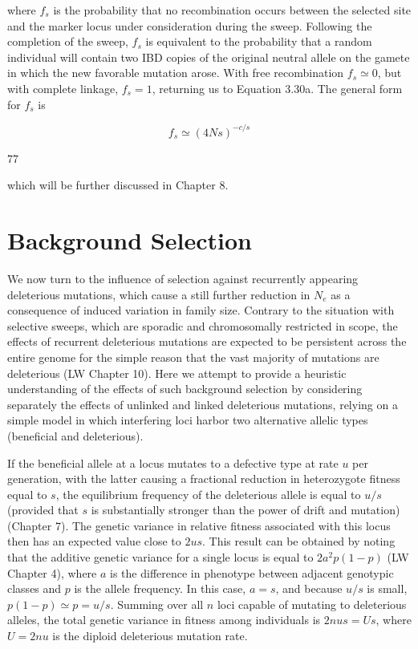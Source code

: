 \documentclass{article}
\begin{document}
where  $ f_s $ is the probability that no recombination occurs between the selected site and the marker locus under consideration during the sweep. Following the completion of the sweep,  $ f_s $ is equivalent to the probability that a random individual will contain two IBD copies of the original neutral allele on the gamete in which the new favorable mutation arose. With free recombination  $ f_s \simeq 0 $, but with complete linkage,  $ f_s = 1 $, returning us to Equation 3.30a. The general form for  $ f_s $ is

\begin{equation}
f_{s}\simeq(4N s)^{-c/s}
\tag{3.31}
\label{eq:3_31}
\end{equation}

77

which will be further discussed in Chapter 8.

\section{Background Selection}
We now turn to the influence of selection against recurrently appearing deleterious mutations, which cause a still further reduction in  $ N_{e} $ as a consequence of induced variation in family size. Contrary to the situation with selective sweeps, which are sporadic and chromosomally restricted in scope, the effects of recurrent deleterious mutations are expected to be persistent across the entire genome for the simple reason that the vast majority of mutations are deleterious (LW Chapter 10). Here we attempt to provide a heuristic understanding of the effects of such background selection by considering separately the effects of unlinked and linked deleterious mutations, relying on a simple model in which interfering loci harbor two alternative allelic types (beneficial and deleterious).

If the beneficial allele at a locus mutates to a defective type at rate  $ u $ per generation, with the latter causing a fractional reduction in heterozygote fitness equal to  $ s $, the equilibrium frequency of the deleterious allele is equal to  $ u/s $ (provided that  $ s $ is substantially stronger than the power of drift and mutation) (Chapter 7). The genetic variance in relative fitness associated with this locus then has an expected value close to  $ 2us $. This result can be obtained by noting that the additive genetic variance for a single locus is equal to  $ 2a^2p(1 - p) $ (LW Chapter 4), where  $ a $ is the difference in phenotype between adjacent genotypic classes and  $ p $ is the allele frequency. In this case,  $ a = s $, and because  $ u/s $ is small,  $ p(1 - p) \simeq p = u/s $. Summing over all  $ n $ loci capable of mutating to deleterious alleles, the total genetic variance in fitness among individuals is  $ 2nus = Us $, where  $ U = 2nu $ is the diploid deleterious mutation rate.
\end{document}
